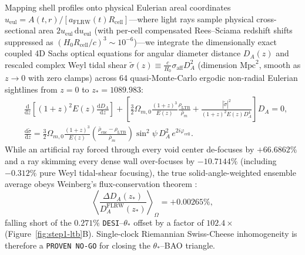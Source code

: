\documentclass[11pt,a4paper]{article}
\begin{document}
Mapping shell profiles onto physical Eulerian areal coordinates $u_{\mathrm{eul}} = A(t,r)/[a_{\mathrm{FLRW}}(t)R_{\mathrm{cell}}]$---where light rays sample physical cross-sectional area $2 u_{\mathrm{eul}}\,\mathrm{d}u_{\mathrm{eul}}$ (with per-cell compensated Rees--Sciama redshift shifts suppressed as $(H_0 R_{\mathrm{cell}}/c)^3 \sim 10^{-6}$)---we integrate the dimensionally exact coupled 4D Sachs optical equations for angular diameter distance $D_A(z)$ and rescaled complex Weyl tidal shear $\tilde{\sigma}(z) \equiv \frac{c}{H_0}\sigma_{\mathrm{aff}} D_A^2$ (dimension $\mathrm{Mpc}^2$, smooth as $z \to 0$ with zero clamps) across 64 quasi-Monte-Carlo ergodic non-radial Eulerian sightlines from $z = 0$ to $z_* = 1089.983$:
\begin{equation}
\begin{aligned}
    &\frac{\mathrm{d}}{\mathrm{d}z}\!\left[(1+z)^2 E(z)\frac{\mathrm{d}D_A}{\mathrm{d}z}\right] + \left[\frac{3}{2}\Omega_{m,0}\frac{(1+z)^3}{E(z)}\frac{\rho_{\mathrm{LTB}}}{\bar{\rho}_m} + \frac{|\tilde{\sigma}|^2}{(1+z)^2 E(z) D_A^4}\right] D_A = 0, \\
    &\frac{\mathrm{d}\tilde{\sigma}}{\mathrm{d}z} = \frac{3}{2}\Omega_{m,0}\frac{(1+z)^3}{E(z)}\left(\frac{\bar{\rho}_{\mathrm{enc}} - \rho_{\mathrm{LTB}}}{\bar{\rho}_m}\right)\sin^2\psi\, D_A^2\, e^{2i\varphi_{\mathrm{cell}}}.
\end{aligned}
\label{eq:ltb-sachs}
\end{equation}
While an artificial ray forced through every void center de-focuses by $+66.6862\%$ and a ray skimming every dense wall over-focuses by $-10.7144\%$ (including $-0.312\%$ pure Weyl tidal-shear focusing), the true solid-angle-weighted ensemble average obeys Weinberg's flux-conservation theorem \cite{Weinberg1976,KibbleLieu2005}:
\begin{equation}
    \left\langle\frac{\Delta D_A(z_*)}{D_A^{\mathrm{FLRW}}(z_*)}\right\rangle_{\!\Omega} = +0.00265\%,
    \label{eq:weinberg-result}
\end{equation}
falling short of the $0.271\%$ \texttt{DESI}--$\theta_*$ offset by a factor of $102.4\times$ (Figure~\ref{fig:step1-ltb}B). Single-clock Riemannian Swiss-Cheese inhomogeneity is therefore a \texttt{PROVEN NO-GO} for closing the $\theta_*$--BAO triangle.
\end{document}
